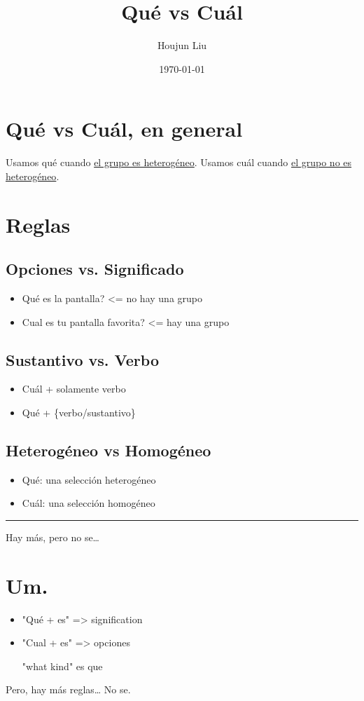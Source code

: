 \documentclass[letterpaper]{article}
\author{Houjun Liu}
\date{\today}
\title{Qué vs Cuál}
\renewcommand{\tableofcontents}{}
\begin{document}
\tableofcontents


\section{Qué vs Cuál, en general}
\label{sec:orgab4e266}
Usamos qué cuando \uline{el grupo es heterogéneo}. Usamos cuál cuando \uline{el grupo no es heterogéneo}.


\section{Reglas}
\label{sec:orgf86b661}
\subsection{Opciones vs. Significado}
\label{sec:orge46a01d}
\begin{itemize}
\item Qué es la pantalla? <= no hay una grupo
\item Cual es tu pantalla favorita? <= hay una grupo
\end{itemize}

\subsection{Sustantivo vs. Verbo}
\label{sec:org2d70791}
\begin{itemize}
\item Cuál + solamente verbo
\item Qué + \{verbo/sustantivo\}
\end{itemize}

\subsection{Heterogéneo vs Homogéneo}
\label{sec:org75b0e19}
\begin{itemize}
\item Qué: una selección heterogéneo
\item Cuál: una selección homogéneo
\end{itemize}

\noindent\rule{\textwidth}{0.5pt}

Hay más, pero no se\ldots{}

\section{Um.}
\label{sec:orge5954e3}
\begin{itemize}
\item "Qué + es" => signification
\item "Cual + es" => opciones

"what kind" es que
\end{itemize}

Pero, hay más reglas\ldots{} No se.
\end{document}

